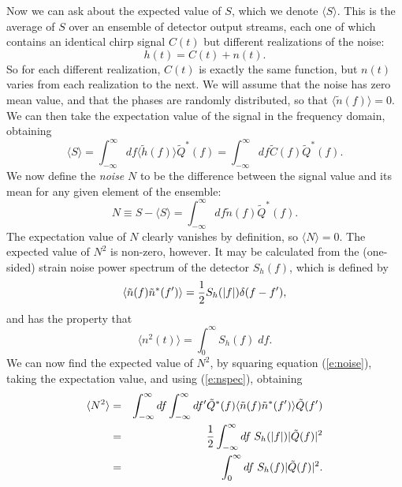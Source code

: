 Now we can ask about the expected value of $S$, which we denote 
$\langle S \rangle$. This is the average of $S$ over an ensemble of 
detector output streams, each one of which contains an identical 
chirp signal $C(t)$ but different realizations of the noise:
\begin{equation}
h(t) = C(t) + n(t).
\end{equation}
So for each different realization, $C(t)$ is exactly the same function,
but $n(t)$ varies from each realization to the next.  We will assume
that the noise has zero mean value, and that the phases are randomly
distributed, so that $\langle \tilde n(f) \rangle=0$.  We can then take
the expectation value of the signal in the frequency domain, obtaining
\begin{equation}
\langle S \rangle = \int_{-\infty}^\infty df \langle \tilde h(f)
\rangle \tilde Q^*(f) = \int_{-\infty}^\infty df \tilde C(f) \tilde
Q^*(f).
\end{equation}
We now define the {\it noise} $N$ to be the difference between the
signal value and its mean for any given element of the ensemble:
\begin{equation}
\label{e:noise}
N \equiv S-\langle S \rangle = \int_{-\infty}^\infty df \tilde n(f) \tilde Q^* (f).
\end{equation}
The expectation value of $N$ clearly vanishes by definition, so
$\langle N \rangle=0$.  The expected value of $N^2$ is non-zero,
however.   It may be calculated from the (one-sided) strain noise power
spectrum of the detector $S_h(f)$, which is defined by
\begin{equation}
\label{e:nspec}
\langle \tilde n(f) \tilde n^*(f') \rangle = {1 \over 2} S_h(|f|) \delta(f-f'),
\end{equation}
and has the property that 
\begin{equation}
\langle n^2(t) \rangle = \int_0^\infty S_h(f) \; df.
\end{equation}
We can now find the expected value of $N^2$, by squaring equation (\ref{e:noise}),
taking the expectation value, and using (\ref{e:nspec}), obtaining
\begin{eqnarray}
\nonumber
\langle N^2 \rangle &= & \int_{-\infty}^\infty df \int_{-\infty}^\infty
df' \tilde Q^*(f) \langle \tilde n(f)   \tilde n^*(f') \rangle \tilde
Q(f') \\
\nonumber
& = & {1 \over 2} \int_{-\infty}^\infty df \; S_h(|f|) |\tilde Q(f) |^2\\
\label{e:n2}
& = &  \int_{0}^\infty df \; S_h(f) |\tilde Q(f) |^2.
\end{eqnarray}

